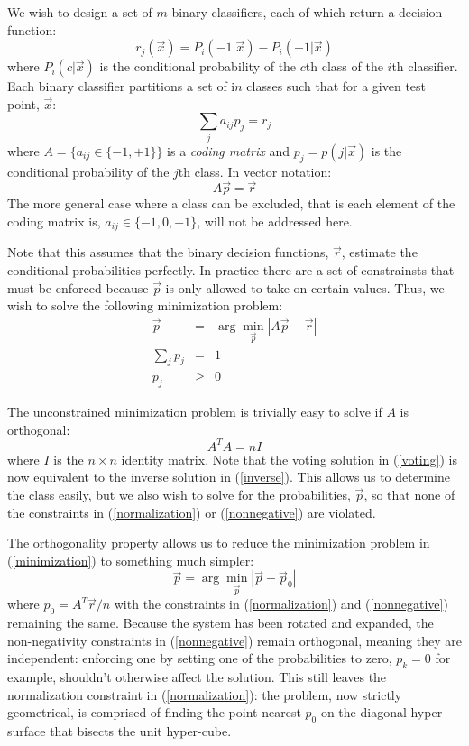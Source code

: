 We wish to design a set of $m$ binary classifiers, each of which return a 
decision function:
\begin{equation}
r_j(\vec x) = P_i(-1 | \vec x) - P_i(+1 | \vec x)
\end{equation}
where $P_i(c | \vec x)$ is the conditional probability of the $c$th class of
the $i$th classifier.
Each binary classifier partitions a set of i$n$ classes such that for a
given test point, $\vec x$:
\begin{equation}
\sum_j a_{ij} p_j = r_j
\end{equation}
where $A=\lbrace a_{ij} \in \lbrace -1, +1 \rbrace  \rbrace$ is a {\it coding
matrix} and $p_j = p(j | \vec x)$ is the conditional probability of the $j$th
class.
In vector notation:
\begin{equation}
	A \vec p = \vec r \label{inverse}
\end{equation}
The more general case where a class can be excluded, that is each element of 
the coding matrix is, $a_{ij} \in \lbrace -1, 0, +1\rbrace$, 
will not be addressed here.

Note that this assumes that the binary decision functions, $\vec r$,
estimate the conditional probabilities perfectly.
In practice
there are a set of constrainsts that must be enforced
because $\vec p$ is only allowed to take on certain values.
Thus, we wish to solve the following minimization problem:
\begin{eqnarray}
	\vec p & = & \arg \min_{\vec p} | A \vec p - \vec r | \label{minimization}\\
	\sum_j p_j & = & 1 \label{normalization}\\
	p_j & \ge & 0 \label{nonnegative}
\end{eqnarray}

The unconstrained minimization problem is trivially easy to solve
if $A$ is orthogonal:
\begin{equation}
	A^T A = n I
\end{equation}
where $I$ is the $n \times n$ identity matrix.
Note that the voting solution in (\ref{voting}) is now equivalent to
the inverse solution in (\ref{inverse}).
This allows us to determine the class easily, but we also wish to solve for
the probabilities, $\vec p$, so that none of the constraints in 
(\ref{normalization}) or (\ref{nonnegative}) are violated.

The orthogonality property allows us to reduce the minimization problem 
in (\ref{minimization}) to something much simpler:
\begin{equation}
	\vec p = \arg \min_{\vec p} | \vec p - \vec p_0 |
\end{equation}
where $p_0 = A^T \vec r/n$ with the constraints in (\ref{normalization}) and
(\ref{nonnegative}) remaining the same.
Because the system has been rotated and expanded, the non-negativity 
constraints in (\ref{nonnegative}) remain orthogonal, meaning they are 
independent: enforcing one by setting one of the probabilities to zero, 
$p_k=0$ for example, shouldn't otherwise affect the solution.
This still leaves the normalization constraint in (\ref{normalization}):
the problem, now strictly geometrical, is comprised of finding the point nearest $p_0$ on the diagonal hyper-surface that bisects the unit hyper-cube.

